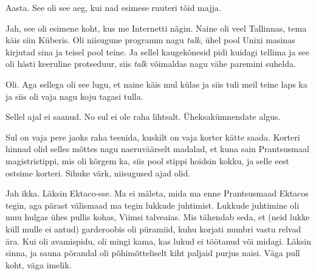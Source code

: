
Aasta. See oli see aeg, kui nad esimese ruuteri tõid majja.


Jah, see oli esimene koht, kus me Internetti nägin. Naine oli veel Tallinnas, tema käis siin Küberis. Oli niisugune programm nagu \emph{talk}, ühel pool Unixi masinas kirjutad sina ja teisel pool teine. Ja sellel kaugekõnesid pidi kuidagi tellima ja see oli hästi keeruline protseduur, siis \emph{talk} võimaldas nagu vähe paremini suhelda.

          
Oli. Aga sellega oli see lugu, et naine käis mul külas ja siis tuli meil teine laps ka ja siis oli vaja nagu koju tagasi tulla.
                 

Sellel ajal ei saanud. No sul ei ole raha lihtsalt. Üheksakümnendate algus.

Sul on vaja pere jaoks raha teenida, kuskilt on vaja korter kätte saada. Korteri hinnad olid selles mõttes nagu naeruväärselt madalad, et kuna sain Prantsusmaal magistristippi, mis oli kõrgem ka, siis pool stippi hoidsin kokku, ja selle eest ostsime korteri. Sihuke värk, niisugused ajad olid. 


Jah ikka. Läksin Ektaco-sse. Ma ei mäleta, mida ma enne Prantsusmaad Ektacos tegin, aga pärast välismaad ma tegin lukkude juhtimist. Lukkude juhtimine oli muu hulgas ühes pullis kohas, Viimsi talveaias. Mis tähendab seda, et  (neid lukke küll mulle ei antud) garderoobis oli püramiid, kuhu korjati numbri vastu relvad ära. Kui oli avamispidu, oli mingi kama, kas lukud ei töötanud või midagi. Läksin sinna, ja sauna põrandal oli põhimõtteliselt kiht paljaid purjus naisi. Väga pull koht, väga imelik.
 
